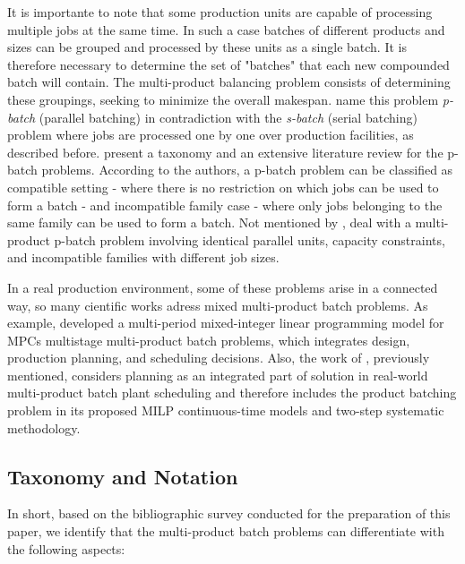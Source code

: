 \documentclass[10pt,fleqn,a4paper,twoside]{article}
\begin{document}
It is importante to note that some production units are capable of processing multiple jobs at the same time. In such a case batches of different products and sizes can be grouped and processed by these units as a single batch. It is therefore necessary to determine the set of "batches" that each new compounded batch will contain. The multi-product balancing problem consists of determining these groupings, seeking to minimize the overall makespan. \cite{KashanOzturk2022} name this problem \emph{p-batch} (parallel batching) in contradiction with the \emph{s-batch} (serial batching) problem where jobs are processed one by one over production facilities, as described before.  \cite{FowlerMonch2022} present a taxonomy and an extensive literature review for the p-batch problems. According to the authors, a p-batch problem can be classified as compatible setting - where there is no restriction on which jobs can be used to form a batch - and incompatible family case - where only jobs belonging to the same family can be used to form a batch. Not mentioned by \cite{FowlerMonch2022}, \cite{LiEtAl2022} deal with a multi-product p-batch problem involving identical parallel units, capacity constraints, and incompatible families with different job sizes. 

In a real production environment, some of these problems arise in a connected way, so many cientific works adress mixed multi-product batch problems. As example, \cite{FumeroEtAl2016} developed a multi-period mixed-integer linear programming model for MPCs multistage multi-product batch problems, which integrates design, production planning, and scheduling decisions. Also, the work of \cite{MendezEtAll2000}, previously mentioned, considers planning as an integrated part of solution in real-world multi-product batch plant scheduling and therefore includes the product batching problem in its proposed MILP continuous-time models and two-step systematic methodology.

\subsection{Taxonomy and Notation}

In short, based on the bibliographic survey conducted for the preparation of this paper, we identify that the multi-product batch problems can differentiate with the following aspects:
\end{document}
